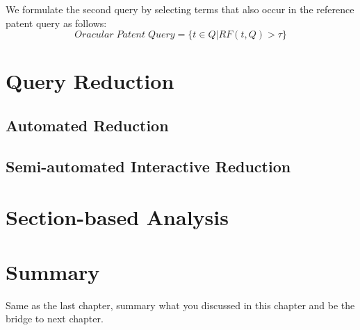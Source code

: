 We formulate the second query by selecting terms that also occur in the reference patent query as follows:
\begin{equation}
 Oracular \; Patent \; Query = \{t\in Q|RF(t, Q)>\tau\}   
 \label{eq:score}
\end{equation}
%

\section{Query Reduction}

\subsection{Automated Reduction}
\subsection{Semi-automated Interactive Reduction}

\section{Section-based Analysis}

\section{Summary}
Same as the last chapter, summary what you discussed in this chapter and
be the bridge to next chapter.
